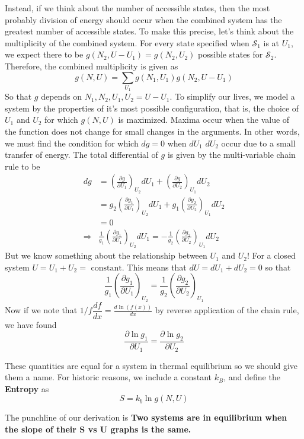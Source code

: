 \documentclass{article}
\begin{document}
Instead, if we think about the number of accessible states, then the most
probably division of energy should occur when the combined system has the
greatest number of accessible states. To make this precise, let's think about
the multiplicity of the combined system. For every state specified when
$\mathcal{S}_1$ is at $U_1$, we expect there to be $g(N_2, U-U_1)=g(N_2,U_2)$
possible states for $\mathcal{S}_2$. Therefore, the combined multiplicity is
given as
\begin{equation}
  g(N,U) = \sum_{U_1}g(N_1, U_1)g(N_2, U-U_1)
\end{equation}
So that $g$ depends on $N_1, N_2,U_1, U_2 = U-U_1$. To simplify our lives, we    
model a system by the properties of it's most possible configuration, that is,
the choice of $U_1$ and $U_2$ for which $g(N,U)$ is maximized. Maxima occur when
the value of the function does not change for small changes in the arguments. In
other words, we must find the condition for which $dg=0$ when $dU_1$ $dU_2$
occur due to a small transfer of energy. The total differential of $g$ is given
by the multi-variable chain rule to be
\begin{align}
  dg &= \left( \frac{\partial g}{\partial U_1} \right)_{U_2}dU_1+\left( \frac{\partial g}{\partial U_2} \right)_{U_1}dU_2 \\
     &=  g_2\left( \frac{\partial g_1}{\partial U_1} \right)_{U_2}dU_1+g_1\left( \frac{\partial g_2}{\partial U_2} \right)_{U_1}dU_2\\
     &= 0\\
 \Rightarrow& \frac{1}{g_1}\left( \frac{\partial g_1}{\partial U_1} \right)_{U_2}dU_1  = -\frac{1}{g_2}\left( \frac{\partial g_2}{\partial U_2} \right)_{U_1}dU_2
\end{align}
But we know something about the relationship between $U_1$ and $U_2$! For a
closed system $U=U_1+U_2=\textrm{ constant}$. This means that $dU=dU_1+dU_2=0$
so that
\begin{equation}
  \frac{1}{g_1}\left( \frac{\partial g_1}{\partial U_1} \right)_{U_2}  = \frac{1}{g_2}\left( \frac{\partial g_2}{\partial U_2} \right)_{U_1}
\end{equation}
Now if we note that $1/f\dfrac{df}{dx}=\frac{d \ln(f(x))}{d x}$ by reverse
application of the chain rule, we have found
\begin{equation}
  \frac{\partial \ln g_1}{\partial U_1} = \frac{\partial \ln g_2}{\partial U_2}
\end{equation}

These quantities are equal for a system in thermal equilibrium so we should give
them a name. For historic reasons, we include a constant $k_B$, and define the
\textbf{Entropy} as
\begin{equation}
  S = k_b\ln g(N,U)
\end{equation}

The punchline of our derivation is \textbf{Two systems are in equilibrium when
 the slope of their S vs U graphs is the same.}
\end{document}
